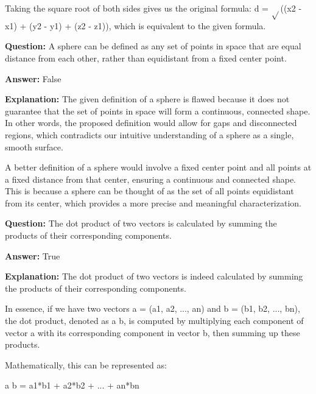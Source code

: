 \documentclass{article}
\begin{document}
Taking the square root of both sides gives us the original formula: d = \ensuremath{\sqrt{}}((x2 - x1){\texttwosuperior} + (y2 - y1){\texttwosuperior} + (z2 - z1){\texttwosuperior}), which is equivalent to the given formula.
                
                \vspace{0.5cm} 
        
            
                \textbf {Question:} A sphere can be defined as any set of points in space that are equal distance from each other, rather than equidistant from a fixed center point.
                
                \textbf{Answer:} False

                \textbf{Explanation:} The given definition of a sphere is flawed because it does not guarantee that the set of points in space will form a continuous, connected shape. In other words, the proposed definition would allow for gaps and disconnected regions, which contradicts our intuitive understanding of a sphere as a single, smooth surface.

A better definition of a sphere would involve a fixed center point and all points at a fixed distance from that center, ensuring a continuous and connected shape. This is because a sphere can be thought of as the set of all points equidistant from its center, which provides a more precise and meaningful characterization.
                
                \vspace{0.5cm} 
        
            
                \textbf {Question:} The dot product of two vectors is calculated by summing the products of their corresponding components.
                
                \textbf{Answer:} True

                \textbf{Explanation:} The dot product of two vectors is indeed calculated by summing the products of their corresponding components.

In essence, if we have two vectors a = (a1, a2, ..., an) and b = (b1, b2, ..., bn), the dot product, denoted as a {\textperiodcentered} b, is computed by multiplying each component of vector a with its corresponding component in vector b, then summing up these products.

Mathematically, this can be represented as:

a {\textperiodcentered} b = a1*b1 + a2*b2 + ... + an*bn
\end{document}
